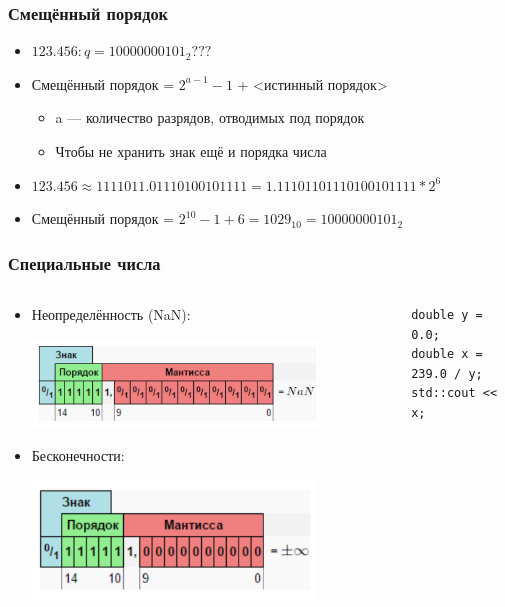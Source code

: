 \documentclass[xetex,mathserif,serif]{beamer}
\begin{document}
	\begin{frame}
		\frametitle{Смещённый порядок}
		\begin{itemize}
			\item $123.456:  q = 10000000101_2???$
			\item Смещённый порядок =  $2^{a - 1} - 1$ + <истинный порядок>
			\begin{itemize}
				\item a --- количество разрядов, отводимых под порядок
				\item Чтобы не хранить знак ещё и порядка числа
			\end{itemize}
			\item $123.456 \approx 1111011.01110100101111 = 1.11101101110100101111 * 2^6$
			\item Смещённый порядок = $2^{10} - 1 + 6 = 1029_{10} = 10000000101_2$
		\end{itemize}
	\end{frame}

	\begin{frame}[fragile]
		\frametitle{Специальные числа}
		\begin{columns}
			\begin{column}{0.6\textwidth}
				\begin{itemize}
					\item Неопределённость (NaN):
					\begin{center}
						\includegraphics[width=0.8\textwidth]{nan.png}
					\end{center}
					\item Бесконечности:
					\begin{center}
						\includegraphics[width=0.8\textwidth]{infinity.png}
					\end{center}
				\end{itemize}
			\end{column}
			\begin{column}{0.4\textwidth}
				\begin{footnotesize}
					\begin{verbatim}
double y = 0.0;
double x = 239.0 / y;
std::cout << x;
					\end{verbatim}
				\end{footnotesize}
			\end{column}
		\end{columns}
	\end{frame}
\end{document}
